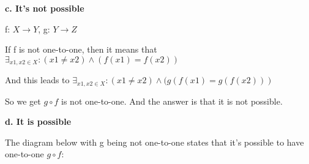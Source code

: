 \documentclass[11pt]{article}
\begin{document}
	\textbf{c. It's not possible}
	
	f: $X\rightarrow Y$, g: $Y\rightarrow Z$
	
	If f is not one-to-one, then it means that $\exists_{x1, x2 \in X}: (x1\neq x2)\wedge (f(x1)=f(x2))$
	
	And this leads to 
	$\exists_{x1,x2\in X}:(x1\neq x2)\wedge(g(f(x1) = g(f(x2)))$
	
	So we get $g\circ f$ is not one-to-one. And the answer is that it is not possible.
	
	\textbf{d. It is possible}
    
	The diagram below with g being not one-to-one states that it's possible to have one-to-one $g\circ f$:
	
\end{document}
